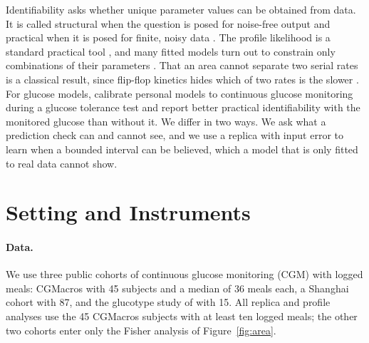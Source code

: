 \documentclass[letterpaper]{article} %
\newcommand{\resCohortCgmMealsMedian}{36}
\newcommand{\resCohortCgmSubjects}{45}
\newcommand{\resCohortHallSubjects}{15}
\newcommand{\resCohortShanghaiSubjects}{87}
\begin{document}
Identifiability asks whether unique parameter values can be obtained from data. It is called structural when the question is posed for noise-free output and practical when it is posed for finite, noisy data \citep{cobelli1980parameter,miao2011identifiability,wieland2021structural}. The profile likelihood is a standard practical tool \citep{raue2009structural}, and many fitted models turn out to constrain only combinations of their parameters \citep{gutenkunst2007universally,eisenberg2014determining}. That an area cannot separate two serial rates is a classical result, since flip-flop kinetics hides which of two rates is the slower \citep{boxenbaum1998flipflop}. For glucose models, \citet{erdos2024leveraging} calibrate personal models to continuous glucose monitoring during a glucose tolerance test and report better practical identifiability with the monitored glucose than without it. We differ in two ways. We ask what a prediction check can and cannot see, and we use a replica with input error to learn when a bounded interval can be believed, which a model that is only fitted to real data cannot show.

\section{Setting and Instruments}\label{sec:setting}

\paragraph{Data.} We use three public cohorts of continuous glucose monitoring (CGM) with logged meals: CGMacros \citep{das2025cgmacros} with \resCohortCgmSubjects{} subjects and a median of \resCohortCgmMealsMedian{} meals each, a Shanghai cohort \citep{zhao2023shanghai} with \resCohortShanghaiSubjects{}, and the glucotype study of \citet{hall2018glucotypes} with \resCohortHallSubjects{}. All replica and profile analyses use the \resCohortCgmSubjects{} CGMacros subjects with at least ten logged meals; the other two cohorts enter only the Fisher analysis of Figure~\ref{fig:area}.
\end{document}
